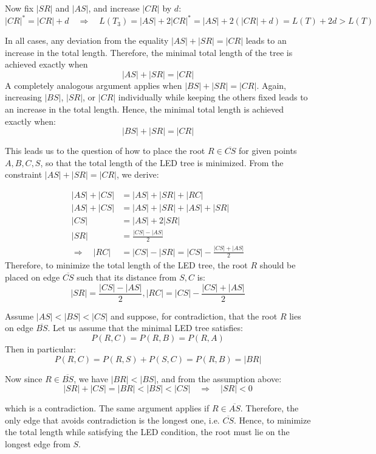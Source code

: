 \documentclass[12pt]{article}
\newcommand{\Price}[2]{P(#1,#2)}
\begin{document}
	Now fix \( |SR| \) and \( |AS| \), and increase \( |CR| \) by \( d \):
	\[
	|CR|^* = |CR| + d \quad \Rightarrow \quad L(T_3) = |AS| + 2|CR|^* = |AS| + 2(|CR| + d) = L(T) + 2d > L(T)
	\]
	
	In all cases, any deviation from the equality \( |AS| + |SR| = |CR| \) leads to an increase in the total length.  
	Therefore, the minimal total length of the tree is achieved exactly when
	\[
	|AS| + |SR| = |CR|
	\]
	A completely analogous argument applies when \( |BS| + |SR| = |CR| \).  
	Again, increasing \( |BS| \), \( |SR| \), or \( |CR| \) individually while keeping the others fixed leads to an increase in the total length.  
	Hence, the minimal total length is achieved exactly when:
	\[
	|BS| + |SR| = |CR|
	\]
	
	
	This leads us to the question of how to place the root \( R \in \overline{CS} \) for given points \( A, B, C, S \), so that the total length of the LED tree is minimized. From the constraint \( |AS|+|SR| = |CR|  \), we derive:
	
	\begin{align*}
		|AS| + |CS| &= |AS| + |SR| + |RC| \\
		|AS|+|CS| &= |AS|+|SR|+|AS|+|SR| \\ 
		|CS| &= |AS|+2|SR| \\
		|SR| &= \frac{|CS| - |AS|}{2} \\
		\Rightarrow \quad |RC| &= |CS| - |SR| = |CS| - \frac{|CS| + |AS|}{2}
	\end{align*}
	Therefore, to minimize the total length of the LED tree, the root \( R \) should be placed on edge \( \overline{CS} \) such that its distance from \( S, C\) is:
	\[
	|SR| = \frac{|CS| - |AS|}{2},  |RC| = |CS| - \frac{|CS| + |AS|}{2}
	\]
	
	Assume \( |AS| < |BS| < |CS| \) and suppose, for contradiction, that the root \( R \) lies on edge \( \overline{BS} \).  
	Let us assume that the minimal LED tree satisfies:
	\[
	\Price{R}{C} = \Price{R}{B} = \Price{R}{A}
	\]
	Then in particular:
	\[
	\Price{R}{C} = \Price{R}{S} + \Price{S}{C} = \Price{R}{B} = |BR|
	\]
	
	Now since \( R \in \overline{BS} \), we have \( |BR| < |BS| \), and from the assumption above:
	\[
	|SR| + |CS| = |BR| < |BS| < |CS|
	\quad \Rightarrow \quad |SR| < 0
	\]
	
	which is a contradiction.  
	The same argument applies if \( R \in \overline{AS} \).  
	Therefore, the only edge that avoids contradiction is the longest one, i.e. \( \overline{CS} \).  
	Hence, to minimize the total length while satisfying the LED condition, the root must lie on the longest edge from \( S \).
	
	
	
\end{document}
